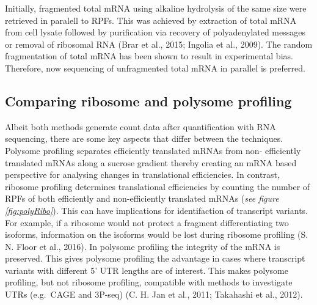 \documentclass[12pt,openany]{book}
\begin{document}
Initially, fragmented total mRNA using alkaline hydrolysis of the same
size were retrieved in paralell to RPFs. This was achieved by extraction
of total mRNA from cell lysate followed by purification via recovery of
polyadenylated messages or removal of ribosomal RNA (Brar et al., 2015;
Ingolia et al., 2009). The random fragmentation of total mRNA has been
shown to result in experimental bias. Therefore, now sequencing of
unfragmented total mRNA in parallel is preferred.

\subsection{Comparing ribosome and polysome profiling}

Albeit both methods generate count data after quantification with RNA
sequencing, there are some key aspects that differ between the
techniques. Polysome profiling separates efficiently translated mRNAs
from non- efficiently translated mRNAs along a sucrose gradient thereby
creating an mRNA based perspective for analysing changes in
translational efficiencies. In contrast, ribosome profiling determines
translational efficiencies by counting the number of RPFs of both
efficiently and non-efficiently translated mRNAs (\emph{see figure
\ref{fig:polyRibo}}). This can have implications for identifaction of
transcript variants. For example, if a ribosome would not protect a
fragment differentiating two isoforms, information on the isoforms would
be lost during ribosome profiling (S. N. Floor et al., 2016). In
polysome profiling the integrity of the mRNA is preserved. This gives
polysome profiling the advantage in cases where transcript variants with
different 5' UTR lengths are of interest. This makes polysome profiling,
but not ribosome profiling, compatible with methods to investigate UTRs
(e.g.~CAGE and 3P-seq) (C. H. Jan et al., 2011; Takahashi et al., 2012).
\end{document}
